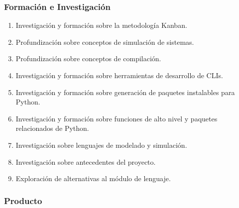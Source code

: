 \subsubsection{Formación e Investigación}
\begin{enumerate}
    \item Investigación y formación sobre la metodología Kanban.
    \item Profundización sobre conceptos de simulación de sistemas.
    \item Profundización sobre conceptos de compilación.
    \item Investigación y formación sobre herramientas de desarrollo de CLIs.
    \item Investigación y formación sobre generación de paquetes instalables
    para Python.
    \item Investigación y formación sobre funciones de alto nivel y paquetes
    relacionados de Python.
    \item Investigación sobre lenguajes de modelado y simulación.
    \item Investigación sobre antecedentes del proyecto.
    \item Exploración de alternativas al módulo de lenguaje.
\end{enumerate}

\subsubsection{Producto}
